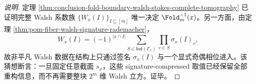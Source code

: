 \begin{proof}[说明]
定理 \ref{thm:conclusion-fold-boundary-walsh-stokes-complete-tomography} 已证明完整 Walsh 系数族 \(\{W_x(I)\}_{I\subseteq[m]}\) 唯一决定 \(\Fold_m^{-1}(x)\)。另一方面，由定理 \ref{thm:pom-fiber-walsh-signature-rademacher}，
\[
W_x(I)=(-1)^{|x\cap I|}
\sum_{S\in\mathsf{Ind}(\Gamma_x)}\prod_{v\in S}\sigma_x(I)_v,
\]
故非平凡 Walsh 数据在结构上只通过签名 \(\sigma_x(I)\) 与一个显式奇偶相位进入。该猜想断言：一旦固定任意截面 \(s_x\)，这些 signature-compressed 取值已经保留全部重构信息，而不再需要整块 \(2^m\) 维 Walsh 立方。证毕。
\end{proof}
